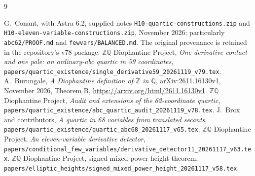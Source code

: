 \documentclass[11pt,a4paper]{article}
\newcommand{\Q}{\mathbb Q}\newcommand{\Z}{\mathbb Z}
\begin{document}
\begin{thebibliography}{9}\footnotesize\raggedright
\setlength{\itemsep}{1pt}
 G.~Conant, with Astra 6.2,
supplied notes \texttt{H10-quartic-constructions.zip} and
\texttt{H10-eleven-variable-constructions.zip}, November 2026;
particularly \texttt{abc62/PROOF.md} and \texttt{fewvars/BALANCED.md}.
The original provenance is retained in the repository's v78 package.
 \(\Z\Q\) Diophantine Project,
\emph{One derivative contact and one pole: an ordinary-abc quartic in 59 coordinates},
\nolinkurl{papers/quartic_existence/single_derivative59_20261119_v79.tex}.
 A.~Burungale,
\emph{A Diophantine definition of $\Z$ in $\Q$},
arXiv:2611.16130v1, November 2026, Theorem B,
\url{https://arxiv.org/html/2611.16130v1}.
 \(\Z\Q\) Diophantine Project,
\emph{Audit and extensions of the 62-coordinate quartic},
\nolinkurl{papers/quartic_existence/abc_quartic_audit_20261119_v78.tex}.
 J.~Brox and contributors,
\emph{A quartic in 68 variables from translated secants},
\nolinkurl{papers/quartic_existence/quartic_abc68_20261117_v65.tex}.
 \(\Z\Q\) Diophantine Project,
\emph{An eleven-variable derivative detector},
\nolinkurl{papers/conditional_few_variables/derivative_detector11_20261117_v63.tex}.
 \(\Z\Q\) Diophantine Project, signed mixed-power height theorem,
\nolinkurl{papers/elliptic_heights/signed_mixed_power_height_20261117_v58.tex}.
\end{thebibliography}
\end{document}
